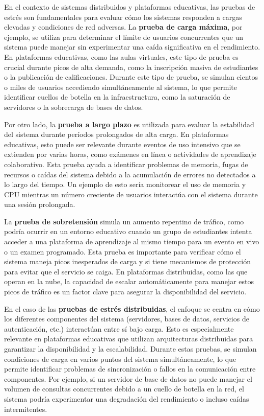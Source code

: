 \documentclass{article}
\begin{document}
En el contexto de sistemas distribuidos y plataformas educativas, las pruebas de estrés son fundamentales para evaluar cómo los sistemas responden a cargas elevadas y condiciones de red adversas. La \textbf{prueba de carga máxima}, por ejemplo, se utiliza para determinar el límite de usuarios concurrentes que un sistema puede manejar sin experimentar una caída significativa en el rendimiento. En plataformas educativas, como las aulas virtuales, este tipo de prueba es crucial durante picos de alta demanda, como la inscripción masiva de estudiantes o la publicación de calificaciones. Durante este tipo de prueba, se simulan cientos o miles de usuarios accediendo simultáneamente al sistema, lo que permite identificar cuellos de botella en la infraestructura, como la saturación de servidores o la sobrecarga de bases de datos.

Por otro lado, la \textbf{prueba a largo plazo} es utilizada para evaluar la estabilidad del sistema durante períodos prolongados de alta carga. En plataformas educativas, esto puede ser relevante durante eventos de uso intensivo que se extienden por varias horas, como exámenes en línea o actividades de aprendizaje colaborativo. Esta prueba ayuda a identificar problemas de memoria, fugas de recursos o caídas del sistema debido a la acumulación de errores no detectados a lo largo del tiempo. Un ejemplo de esto sería monitorear el uso de memoria y CPU mientras un número creciente de usuarios interactúa con el sistema durante una sesión prolongada.

La \textbf{prueba de sobretensión} simula un aumento repentino de tráfico, como podría ocurrir en un entorno educativo cuando un grupo de estudiantes intenta acceder a una plataforma de aprendizaje al mismo tiempo para un evento en vivo o un examen programado. Esta prueba es importante para verificar cómo el sistema maneja picos inesperados de carga y si tiene mecanismos de protección para evitar que el servicio se caiga. En plataformas distribuidas, como las que operan en la nube, la capacidad de escalar automáticamente para manejar estos picos de tráfico es un factor clave para asegurar la disponibilidad del servicio.

En el caso de las \textbf{pruebas de estrés distribuidas}, el enfoque se centra en cómo los diferentes componentes del sistema (servidores, bases de datos, servicios de autenticación, etc.) interactúan entre sí bajo carga. Esto es especialmente relevante en plataformas educativas que utilizan arquitecturas distribuidas para garantizar la disponibilidad y la escalabilidad. Durante estas pruebas, se simulan condiciones de carga en varios puntos del sistema simultáneamente, lo que permite identificar problemas de sincronización o fallos en la comunicación entre componentes. Por ejemplo, si un servidor de base de datos no puede manejar el volumen de consultas concurrentes debido a un cuello de botella en la red, el sistema podría experimentar una degradación del rendimiento o incluso caídas intermitentes.
\end{document}

